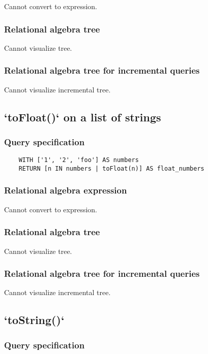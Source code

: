 	Cannot convert to expression.

	\subsubsection*{Relational algebra tree}

	Cannot visualize tree.

	\subsubsection*{Relational algebra tree for incremental queries}

	Cannot visualize incremental tree.
	\subsection{`toFloat()` on a list of strings}

	\subsubsection*{Query specification}

	\begin{lstlisting}
	WITH ['1', '2', 'foo'] AS numbers
	RETURN [n IN numbers | toFloat(n)] AS float_numbers
	\end{lstlisting}


	\subsubsection*{Relational algebra expression}

	Cannot convert to expression.

	\subsubsection*{Relational algebra tree}

	Cannot visualize tree.

	\subsubsection*{Relational algebra tree for incremental queries}

	Cannot visualize incremental tree.
	\subsection{`toString()`}

	\subsubsection*{Query specification}

